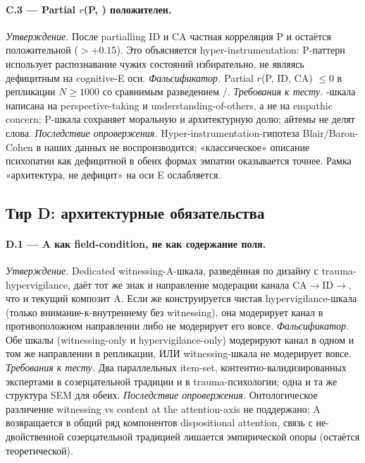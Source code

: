 \paragraph{C.3 --- Partial $r$(P, \Ecog) положителен.}
\emph{Утверждение.} После partialling ID и CA частная корреляция P и \Ecog{} остаётся положительной ($> +0.15$). Это объясняется hyper-instrumentation: P-паттерн использует распознавание чужих состояний избирательно, не являясь дефицитным на cognitive-E оси.
\emph{Фальсификатор.} Partial $r$(P, \Ecog{} \textbar{} ID, CA) $\leq 0$ в репликации $N \geq 1000$ со сравнимым разведением \EAF{}/\Ecog{}.
\emph{Требования к тесту.} \Ecog{}-шкала написана на perspective-taking и understanding-of-others, а не на empathic concern; P-шкала сохраняет моральную и архитектурную долю; айтемы не делят слова.
\emph{Последствие опровержения.} Hyper-instrumentation-гипотеза Blair/Baron-Cohen в наших данных не воспроизводится; «классическое» описание психопатии как дефицитной в обеих формах эмпатии оказывается точнее. Рамка «архитектура, не дефицит» на оси E ослабляется.

\subsection{Тир D: архитектурные обязательства}
\label{subsec:falsification_tier_d}

\paragraph{D.1 --- A как field-condition, не как содержание поля.}
\emph{Утверждение.} Dedicated witnessing-A-шкала, разведённая по дизайну с trauma-hypervigilance, даёт тот же знак и направление модерации канала CA$\to$ID$\to$\EAF, что и текущий композит A. Если же конструируется чистая hypervigilance-шкала (только внимание-к-внутреннему без witnessing), она модерирует канал в противоположном направлении либо не модерирует его вовсе.
\emph{Фальсификатор.} Обе шкалы (witnessing-only и hypervigilance-only) модерируют канал в одном и том же направлении в репликации, ИЛИ witnessing-шкала не модерирует вовсе.
\emph{Требования к тесту.} Два параллельных item-set, контентно-валидизированных экспертами в созерцательной традиции и в trauma-психологии; одна и та же структура SEM для обеих.
\emph{Последствие опровержения.} Онтологическое различение witnessing vs content at the attention-axis не поддержано; A возвращается в общий ряд компонентов dispositional attention, связь с не-двойственной созерцательной традицией лишается эмпирической опоры (остаётся теоретической).

